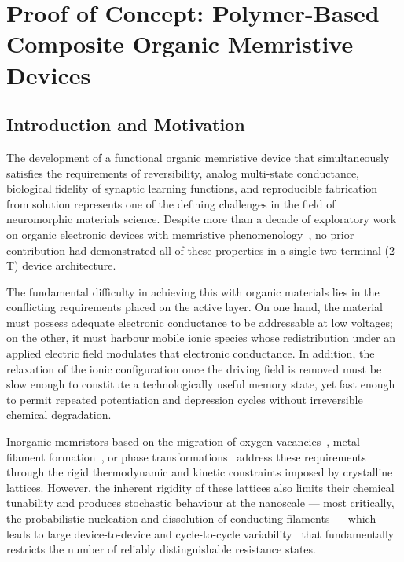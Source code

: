 \documentclass[12pt, a4paper, twoside]{report}
\newcommand{\twoterminal}{two-terminal}
\begin{document}
\setcounter{chapter}{1}   %

\chapter{Proof of Concept: Polymer-Based Composite Organic Memristive Devices}\label{ch:poc}

\section{Introduction and Motivation}\label{sec:ch2_intro}

The development of a functional organic memristive device that simultaneously satisfies the requirements of reversibility, analog multi-state conductance, biological fidelity of synaptic learning functions, and reproducible fabrication from solution represents one of the defining challenges in the field of neuromorphic materials science. Despite more than a decade of exploratory work on organic electronic devices with memristive phenomenology~\cite{Zakhidov2010, Lei2014, Liu2016, Kim2018, Goswami2017}, no prior contribution had demonstrated all of these properties in a single \twoterminal{} (2-T) device architecture.

The fundamental difficulty in achieving this with organic materials lies in the conflicting requirements placed on the active layer. On one hand, the material must possess adequate electronic conductance to be addressable at low voltages; on the other, it must harbour mobile ionic species whose redistribution under an applied electric field modulates that electronic conductance. In addition, the relaxation of the ionic configuration once the driving field is removed must be slow enough to constitute a technologically useful memory state, yet fast enough to permit repeated potentiation and depression cycles without irreversible chemical degradation.

Inorganic memristors based on the migration of oxygen vacancies~\cite{Strukov2008, Yang2008}, metal filament formation~\cite{Yang2018, Kim2018_inorg}, or phase transformations~\cite{LGallo2018} address these requirements through the rigid thermodynamic and kinetic constraints imposed by crystalline lattices. However, the inherent rigidity of these lattices also limits their chemical tunability and produces stochastic behaviour at the nanoscale — most critically, the probabilistic nucleation and dissolution of conducting filaments — which leads to large device-to-device and cycle-to-cycle variability~\cite{Sun2019} that fundamentally restricts the number of reliably distinguishable resistance states.
\end{document}
